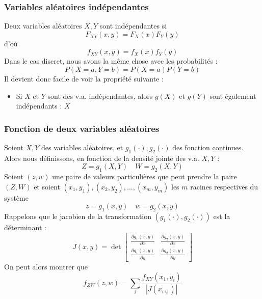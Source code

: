 \documentclass[11pt,a4paper]{article}
\numberwithin{equation}{section}
\begin{document}
\subsubsection{Variables aléatoires indépendantes}
Deux variables aléatoires $X,Y$ sont indépendantes si
\[F_{XY}(x,y) = F_X(x)F_Y(y)\]
d'où
\[f_{XY}(x,y) = f_X(x)f_Y(y)\]
Dans le cas discret, nous avons la même chose avec les probabilités :
\begin{equation}
    P(X=a,Y=b) = P(X=a)P(Y=b)
\end{equation}
Il devient donc facile de voir la propriété suivante :
\begin{itemize}
    \item Si $X$ et $Y$ sont des v.a. indépendantes, alors $g(X)$ et $g(Y)$ sont également indépendants : $X$
\end{itemize}

\subsubsection{Fonction de deux variables aléatoires}
Soient $X,Y$ des variables aléatoires, et $g_1(\cdot),g_2(\cdot)$ des fonction \uline{continues}. Alors nous définissons, en fonction de la densité jointe des v.a. $X,Y$ :
\[Z = g_1(X,Y)\quad W = g_2(X,Y)\]
Soient $(z,w)$ une paire de valeurs particulières que peut prendre la paire $(Z,W)$ et soient $(x_1,y_1),(x_2,y_2),...,(x_m,y_m)$ les $m$ racines respectives du système 
\[z = g_1(x,y)\quad w = g_2(x,y)\]
Rappelons que le jacobien de la transformation $(g_1(\cdot),g_2(\cdot))$ est la déterminant :
\begin{equation}
    J(x,y) = \det
    \begin{bmatrix}
        \frac{\partial g_1(x,y)}{\partial x} & \frac{\partial g_2(x,y)}{\partial x}\\
        \frac{\partial g_1(x,y)}{\partial y} & \frac{\partial g_2(x,y)}{\partial y}
    \end{bmatrix}
\end{equation}
On peut alors montrer que 
\begin{equation}
    f_{ZW}(z,w) = \sum_i \frac{f_{XY}(x_1,y_i)}{|J(x_i,_i)|}
\end{equation}
\end{document}
